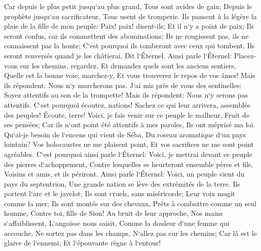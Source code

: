 \verse Car depuis le plus petit jusqu`au plus grand, Tous sont avides de gain; Depuis le prophète jusqu`au sacrificateur, Tous usent de tromperie. 
\verse Ils pansent à la légère la plaie de la fille de mon peuple: Paix! paix! disent-ils; Et il n`y a point de paix; 
\verse Ils seront confus, car ils commettent des abominations; Ils ne rougissent pas, ils ne connaissent pas la honte; C`est pourquoi ils tomberont avec ceux qui tombent, Ils seront renversés quand je les châtierai, Dit l`Éternel. 
\verse Ainsi parle l`Éternel: Placez-vous sur les chemins, regardez, Et demandez quels sont les anciens sentiers, Quelle est la bonne voie; marchez-y, Et vous trouverez le repos de vos âmes! Mais ils répondent: Nous n`y marcherons pas. 
\verse J`ai mis près de vous des sentinelles: Soyez attentifs au son de la trompette! Mais ils répondent: Nous n`y serons pas attentifs. 
\verse C`est pourquoi écoutez, nations! Sachez ce qui leur arrivera, assemblée des peuples! 
\verse Écoute, terre! Voici, je fais venir sur ce peuple le malheur, Fruit de ses pensées; Car ils n`ont point été attentifs à mes paroles, Ils ont méprisé ma loi. 
\verse Qu`ai-je besoin de l`encens qui vient de Séba, Du roseau aromatique d`un pays lointain? Vos holocaustes ne me plaisent point, Et vos sacrifices ne me sont point agréables. 
\verse C`est pourquoi ainsi parle l`Éternel: Voici, je mettrai devant ce peuple des pierres d`achoppement, Contre lesquelles se heurteront ensemble pères et fils, Voisins et amis, et ils périront. 
\verse Ainsi parle l`Éternel: Voici, un peuple vient du pays du septentrion, Une grande nation se lève des extrémités de la terre. 
\verse Ils portent l`arc et le javelot; Ils sont cruels, sans miséricorde; Leur voix mugit comme la mer; Ils sont montés sur des chevaux, Prêts à combattre comme un seul homme, Contre toi, fille de Sion! 
\verse Au bruit de leur approche, Nos mains s`affaiblissent, L`angoisse nous saisit, Comme la douleur d`une femme qui accouche. 
\verse Ne sortez pas dans les champs, N`allez pas sur les chemins; Car là est le glaive de l`ennemi, Et l`épouvante règne à l`entour! 
